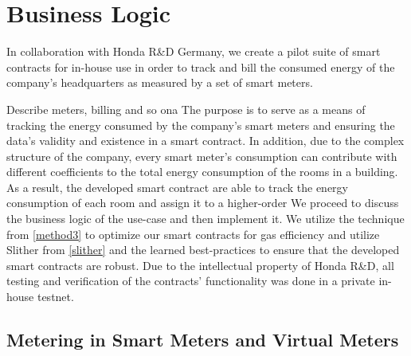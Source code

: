 
\section{Business Logic}
In collaboration with Honda R\&D Germany, we create a pilot suite of smart contracts for in-house use in order to track and bill the consumed energy of the company's headquarters as measured by a set of smart meters. 

Describe meters, billing and so ona
The purpose is to serve as a means of tracking the energy consumed by the company's smart meters and ensuring the data's validity and existence in a smart contract. In addition, due to the complex structure of the company, every smart meter's consumption can contribute with different coefficients to the total energy consumption of the rooms in a building. As a result, the developed smart contract are able to track the energy consumption of each room and assign it to a higher-order 
We proceed to discuss the business logic of the use-case and then implement it. We utilize the technique from \ref{method3} to optimize our smart contracts for gas efficiency and utilize Slither from \ref{slither} and the learned best-practices to ensure that the developed smart contracts are robust. Due to the intellectual property of Honda R\&D, all testing and verification of the contracts' functionality was done in a private in-house testnet.


\subsection{Metering in Smart Meters and Virtual Meters}

